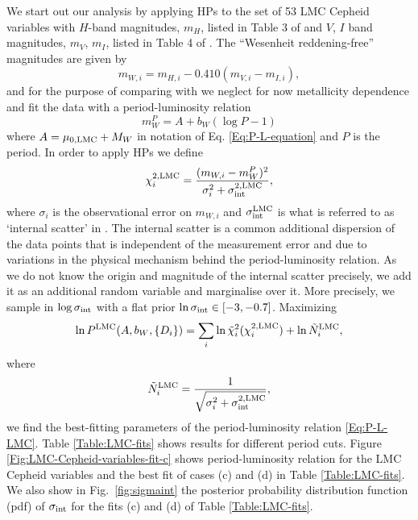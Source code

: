 We start out our analysis by applying HPs to the set of 
53 LMC Cepheid variables with $H$-band magnitudes, $m_H$, listed in Table 3 of  \cite{2004AJ:128.2239P} and $V$, $I$ band magnitudes, $m_V$, $m_I$, listed in Table 4 of \cite{2002ApJS:142:71S}. The ``Wesenheit reddening-free'' magnitudes are given by 
\begin{equation}\label{Eq:Wesenheit-reddening-free}
m_{W,i} = m_{H,i} - 0.410 (m_{V,i} - m_{I,i}),
\end{equation}
and for the purpose of comparing with \cite{Efstathiou:2013via} we neglect for now metallicity dependence and fit the data with a period-luminosity relation
\begin{equation}\label{Eq:P-L-LMC}
m^P_W = A + b_W (\log P - 1)
\end{equation}
where $A = \mu_{0,\mathrm{LMC}} + M_W$ in notation of Eq. \eqref{Eq:P-L-equation} and $P$ is the period. In order to apply HPs we define 
\begin{equation}\label{Eq:chi2-LMC}
\chi^{2,\mathrm{LMC}}_{i} = \frac{(m_{W,i} - m^P_{W})^2}{\sigma_i^2 + \sigma^{2,\mathrm{LMC}}_{\mathrm{int}}},
\end{equation}
where $\sigma_i$ is the observational error on $m_{W,i}$ and $\sigma_{\mathrm{int}}^{\mathrm{LMC}}$ is what is referred to as `internal scatter' in \cite{Efstathiou:2013via}. The internal scatter is a common additional dispersion of the data points that is independent of the measurement error and due to variations in the physical mechanism behind the period-luminosity relation. As we do not know the origin and magnitude of the internal scatter precisely, we add it as an additional random variable and marginalise over it. More precisely, we sample in $\log \sigma_{\mathrm{int}}$ with a flat prior $\ln \sigma_{\mathrm{int}} \in [-3,-0.7]$.
Maximizing  
\begin{equation}
\label{Eq:likelihood-HP}
\ln P^{\mathrm{LMC}}(A,b_W,\lbrace D_i \rbrace) = \sum_{i} \ln \tilde{\chi}_i^{2}(\chi^{2,\mathrm{LMC}}_{i}) + \ln \tilde{N}^{\mathrm{LMC}}_{i},
\end{equation}
where 
\begin{equation}
\label{Eq:normalization}
\tilde{N}^{\mathrm{LMC}}_i = \frac{1}{\sqrt{\sigma_i^2 +\sigma^{2,\mathrm{LMC}}_{\mathrm{int}}}},
\end{equation}
we find the best-fitting parameters of the period-luminosity relation \eqref{Eq:P-L-LMC}. Table \ref{Table:LMC-fits} shows results for different period cuts. Figure \ref{Fig:LMC-Cepheid-variables-fit-c} shows period-luminosity relation for the LMC Cepheid variables and the best fit of cases (c) and (d) in Table \ref{Table:LMC-fits}. We also show in Fig.\ \ref{fig:sigmaint} the posterior probability distribution function (pdf) of $\sigma_{\mathrm{int}}$ for the fits (c) and (d) of Table \ref{Table:LMC-fits}.

